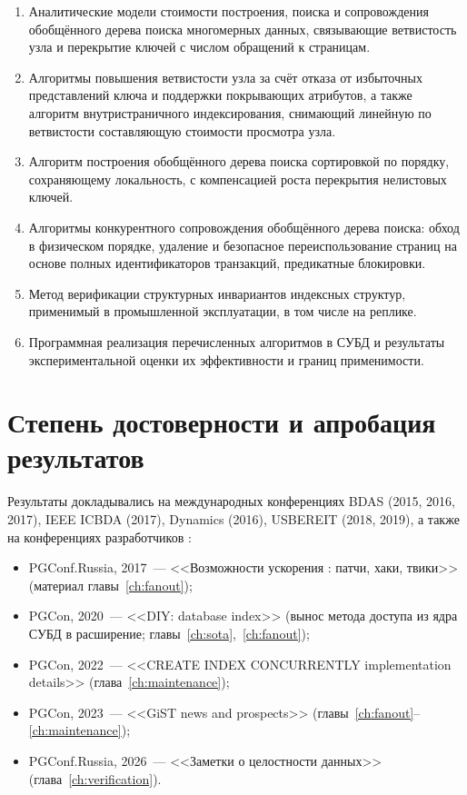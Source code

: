 \begin{enumerate}
\item Аналитические модели стоимости построения, поиска и сопровождения
      обобщённого дерева поиска многомерных данных, связывающие ветвистость узла
      и перекрытие ключей с числом обращений к страницам.
\item Алгоритмы повышения ветвистости узла за счёт отказа от избыточных
      представлений ключа и поддержки покрывающих атрибутов, а также алгоритм
      внутристраничного индексирования, снимающий линейную по ветвистости
      составляющую стоимости просмотра узла.
\item Алгоритм построения обобщённого дерева поиска сортировкой по порядку,
      сохраняющему локальность, с компенсацией роста перекрытия нелистовых
      ключей.
\item Алгоритмы конкурентного сопровождения обобщённого дерева поиска: обход в
      физическом порядке, удаление и безопасное переиспользование страниц на
      основе полных идентификаторов транзакций, предикатные блокировки.
\item Метод верификации структурных инвариантов индексных структур, применимый
      в промышленной эксплуатации, в том числе на реплике.
\item Программная реализация перечисленных алгоритмов в СУБД \pg{} и результаты
      экспериментальной оценки их эффективности и границ применимости.
\end{enumerate}

\section*{Степень достоверности и апробация результатов}

Результаты докладывались на международных конференциях BDAS (2015, 2016, 2017),
IEEE ICBDA (2017), Dynamics (2016), USBEREIT (2018, 2019), а также на
конференциях разработчиков \pg{}:

\begin{itemize}
\item PGConf.Russia, 2017~--- <<Возможности ускорения \gist{}: патчи, хаки,
      твики>> (материал главы~\ref{ch:fanout});
\item PGCon, 2020~--- <<DIY: database index>> (вынос метода доступа из ядра
      СУБД в расширение; главы~\ref{ch:sota},~\ref{ch:fanout});
\item PGCon, 2022~--- <<CREATE INDEX CONCURRENTLY implementation details>>
      (глава~\ref{ch:maintenance});
\item PGCon, 2023~--- <<GiST news and prospects>>
      (главы~\ref{ch:fanout}--\ref{ch:maintenance});
\item PGConf.Russia, 2026~--- <<Заметки о целостности данных>>
      (глава~\ref{ch:verification}).
\end{itemize}

